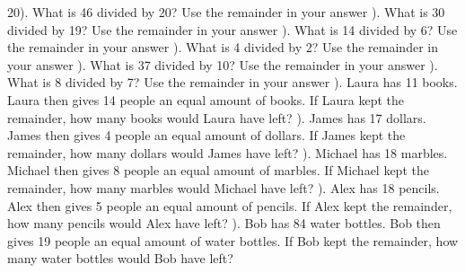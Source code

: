 \documentclass{article}%
\begin{document}
20). What is 46 divided by 20? Use the remainder in your answer%
\newline%
\newline%
). What is 30 divided by 19? Use the remainder in your answer%
\newline%
\newline%
). What is 14 divided by 6? Use the remainder in your answer%
\newline%
\newline%
). What is 4 divided by 2? Use the remainder in your answer%
\newline%
\newline%
). What is 37 divided by 10? Use the remainder in your answer%
\newline%
\newline%
). What is 8 divided by 7? Use the remainder in your answer%
\newline%
\newline%
). Laura has 11 books. Laura then gives 14 people an equal amount of books. If Laura kept the remainder, how many books would Laura have left?%
\newline%
\newline%
). James has 17 dollars. James then gives 4 people an equal amount of dollars. If James kept the remainder, how many dollars would James have left?%
\newline%
\newline%
). Michael has 18 marbles. Michael then gives 8 people an equal amount of marbles. If Michael kept the remainder, how many marbles would Michael have left?%
\newline%
\newline%
). Alex has 18 pencils. Alex then gives 5 people an equal amount of pencils. If Alex kept the remainder, how many pencils would Alex have left?%
\newline%
\newline%
). Bob has 84 water bottles. Bob then gives 19 people an equal amount of water bottles. If Bob kept the remainder, how many water bottles would Bob have left?%
\end{document}
